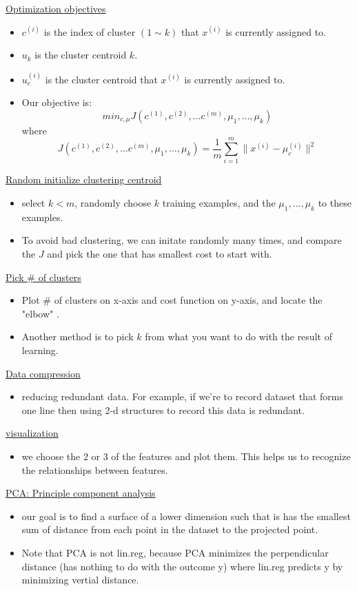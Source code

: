 \documentclass[12pt]{article}
\begin{document}
\underline{Optimization objectives}
\begin{itemize}
	\item $c^{(i)}$ is the index of cluster $(1\sim k)$ that $x^{(i)}$ is currently assigned to.
	\item $u_k$ is the cluster centroid $k$.
	\item $u_c^{(i)}$ is the cluster centroid that $x^{(i)}$ is currently assigned to.
	\item Our objective is: \[min_{c,\mu} J(c^{(1)}, c^{(2)},\ldots c^{(m)},\mu_1,\ldots,\mu_k) \] where\[  
	J(c^{(1)}, c^{(2)},\ldots c^{(m)},\mu_1,\ldots,\mu_k) 
	= \frac{1}{m}\sum_{i=1}^{m} \lVert x^{(i)}-\mu_c^{(i)}\rVert^2
	\]
	
\end{itemize}
\underline{Random initialize clustering centroid}
\begin{itemize}
	\item select $k<m$, randomly choose $k$ training examples, and the $\mu_1,\ldots,\mu_k$ to these examples. 
	\item To avoid bad clustering, we can initate randomly many times, and compare the $J$ and pick the one that has smallest cost to start with.
	
\end{itemize}

\underline{Pick \# of clusters}
\begin{itemize}
	\item Plot \# of clusters on x-axis and cost function on y-axis, and locate the "elbow" .
	\item Another method is to pick $k$ from what you want to do with the result of learning.
\end{itemize}

\underline{Data compression}
\begin{itemize}
	\item reducing redundant data. For example, if we're to record dataset that forms one line then using 2-d structures to record this data is redundant.
\end{itemize}

\underline{visualization}
\begin{itemize}
	\item we choose the 2 or 3 of the features and plot them. This helps us to recognize the relationships between features.
\end{itemize}

\underline{PCA: Principle component analysis}
\begin{itemize}
	\item our goal is to find a surface of a lower dimension such that is has the smallest sum of distance from each point in the dataset to the projected point.
	\item Note that PCA is not lin.reg, because PCA minimizes the perpendicular distance (has nothing to do with the outcome y) where lin.reg predicts y by minimizing vertial distance.
\end{itemize}
\end{document}
